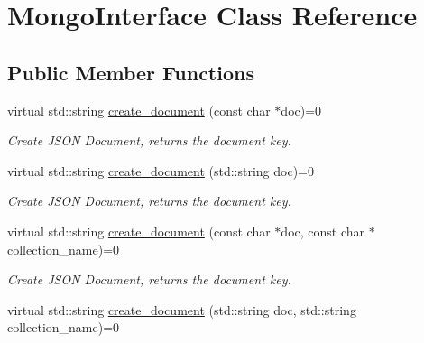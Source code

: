 \hypertarget{classMongoInterface}{\section{Mongo\-Interface Class Reference}
\label{classMongoInterface}
}
\subsection*{Public Member Functions}
\begin{DoxyCompactItemize}
\item 
\hypertarget{classMongoInterface_ae8f5d3e73e20ad60a23f2a89af405077}{virtual std\-::string \hyperlink{classMongoInterface_ae8f5d3e73e20ad60a23f2a89af405077}{create\-\_\-document} (const char $\ast$doc)=0}\label{classMongoInterface_ae8f5d3e73e20ad60a23f2a89af405077}

\begin{DoxyCompactList}\small\item\em Create J\-S\-O\-N Document, returns the document key. \end{DoxyCompactList}\item 
\hypertarget{classMongoInterface_a805b6784e4ff5baf32596369e1e7a4bb}{virtual std\-::string \hyperlink{classMongoInterface_a805b6784e4ff5baf32596369e1e7a4bb}{create\-\_\-document} (std\-::string doc)=0}\label{classMongoInterface_a805b6784e4ff5baf32596369e1e7a4bb}

\begin{DoxyCompactList}\small\item\em Create J\-S\-O\-N Document, returns the document key. \end{DoxyCompactList}\item 
\hypertarget{classMongoInterface_a2681f3f33e7ce62637fb8044a6e15a6b}{virtual std\-::string \hyperlink{classMongoInterface_a2681f3f33e7ce62637fb8044a6e15a6b}{create\-\_\-document} (const char $\ast$doc, const char $\ast$collection\-\_\-name)=0}\label{classMongoInterface_a2681f3f33e7ce62637fb8044a6e15a6b}

\begin{DoxyCompactList}\small\item\em Create J\-S\-O\-N Document, returns the document key. \end{DoxyCompactList}\item 
\hypertarget{classMongoInterface_af864135722496d74ef0742327bc5c629}{virtual std\-::string \hyperlink{classMongoInterface_af864135722496d74ef0742327bc5c629}{create\-\_\-document} (std\-::string doc, std\-::string collection\-\_\-name)=0}\label{classMongoInterface_af864135722496d74ef0742327bc5c629}


\end{DoxyCompactItemize}
